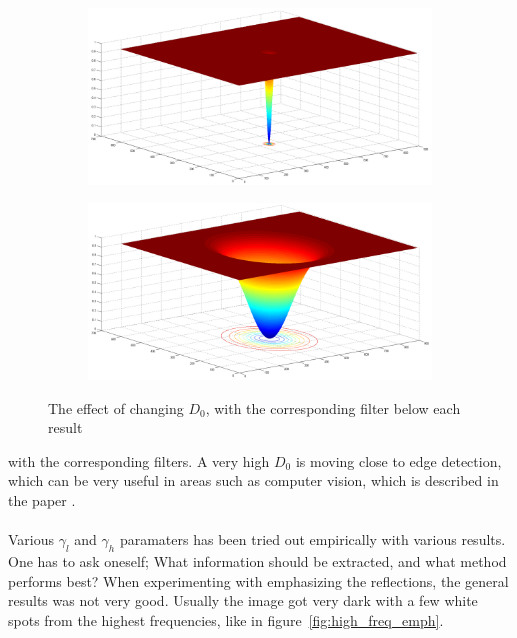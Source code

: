 \begin{figure}[h!]
\begin{subfigure}[b]{0.5\linewidth}
				\includegraphics[width=0.9\linewidth]{pics/low_sigma_filter.png}
				\caption{}
				\label{fig:low_sigma_filter}
			\end{subfigure}%
			\begin{subfigure}[b]{0.5\linewidth}
				\includegraphics[width=0.9\linewidth]{pics/high_sigma_filter.png}
				\caption{}
				\label{fig:high_sigma_filter}
			\end{subfigure}
			\label{fig:sigma}
		\caption{The effect of changing $D_0$, with the corresponding filter below each result}				
		\end{figure}
		with the corresponding filters. A very high $D_0$ is moving close to edge detection,
		which can be very useful in areas such as computer vision, which is described in 
		the paper \cite{Fan20111468}.\\
		\\
		Various $\gamma_l$ and $\gamma_h$ paramaters has been tried out empirically with 
		various results. One has to ask oneself; What information should be extracted, and what 
		method performs best? When experimenting with emphasizing the reflections, the 
		general results was not very good. Usually the image got very dark with a few white
		spots from the highest frequencies, like in figure~\ref{fig:high_freq_emph}.\\
		\\
